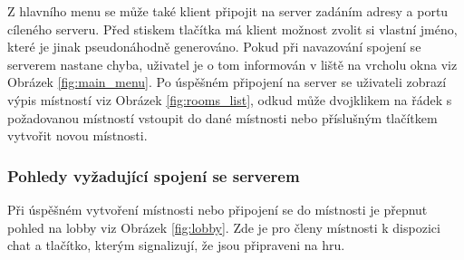 \documentclass[12pt,a4paper]{article}
\begin{document}
Z hlavního menu se může také klient připojit na server zadáním adresy a portu cíleného serveru. Před stiskem tlačítka má klient možnost zvolit si vlastní jméno, které je jinak pseudonáhodně generováno.
Pokud při navazování spojení se serverem nastane chyba, uživatel je o tom informován v liště na vrcholu okna viz Obrázek \ref{fig:main_menu}.
Po úspěšném připojení na server se uživateli zobrazí výpis místností viz Obrázek \ref{fig:rooms_list}, odkud může dvojklikem na řádek s požadovanou místností vstoupit do dané místnosti nebo příslušným tlačítkem vytvořit novou místnosti.
\newpage
\subsubsection*{Pohledy vyžadující spojení se serverem}
Při úspěšném vytvoření místnosti nebo připojení se do místnosti je přepnut pohled na lobby viz Obrázek \ref{fig:lobby}. Zde je pro členy místnosti k dispozici chat a tlačítko, kterým signalizují, že jsou připraveni na hru.
\end{document}

